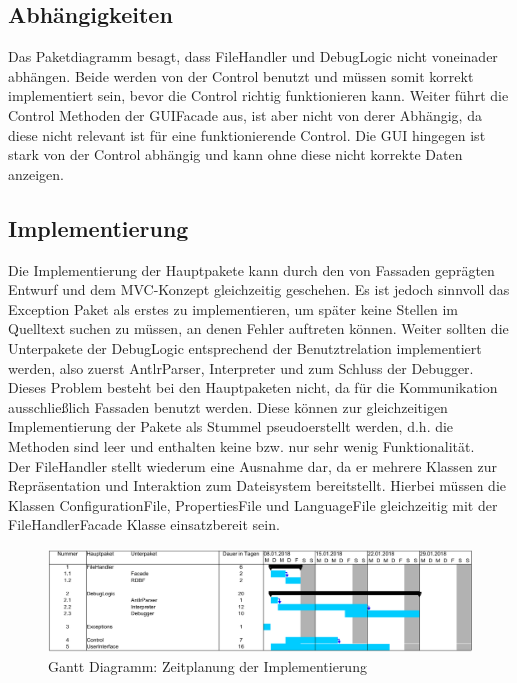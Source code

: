 \documentclass[parskip=full]{scrartcl}
\begin{document}
\subsection{Abhängigkeiten}
Das Paketdiagramm besagt, dass FileHandler und DebugLogic nicht voneinader abhängen.
Beide werden von der Control benutzt und müssen somit korrekt implementiert sein, bevor die Control richtig funktionieren kann. Weiter führt die Control Methoden der GUIFacade aus, ist aber nicht von derer Abhängig, da diese nicht relevant ist für eine funktionierende Control.
Die GUI hingegen ist stark von der Control abhängig und kann ohne diese nicht korrekte Daten anzeigen.

\subsection{Implementierung}
Die Implementierung der Hauptpakete kann durch den von Fassaden geprägten Entwurf und dem MVC-Konzept gleichzeitig geschehen. Es ist jedoch sinnvoll das Exception Paket als erstes zu implementieren, um später keine Stellen im Quelltext suchen zu müssen, an denen Fehler auftreten können.
Weiter sollten die Unterpakete der DebugLogic entsprechend der Benutztrelation implementiert werden, also zuerst AntlrParser, Interpreter und zum Schluss der Debugger.
Dieses Problem besteht bei den Hauptpaketen nicht, da für die Kommunikation ausschließlich Fassaden benutzt werden. Diese können zur gleichzeitigen Implementierung der Pakete als Stummel pseudoerstellt werden, d.h. die Methoden sind leer und enthalten keine bzw. nur sehr wenig Funktionalität.\\
Der FileHandler stellt wiederum eine Ausnahme dar, da er mehrere Klassen zur Repräsentation und Interaktion zum Dateisystem bereitstellt.
Hierbei müssen die Klassen ConfigurationFile, PropertiesFile und LanguageFile gleichzeitig mit der FileHandlerFacade Klasse einsatzbereit sein.

\begin{figure}[!h]
\centering
\includegraphics[width=1.0\textwidth]{GanttDiagramm_withArrows.pdf}
\caption{Gantt Diagramm: Zeitplanung der Implementierung}
\end{figure}
\end{document}
